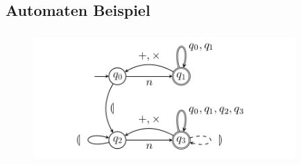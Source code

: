 \documentclass[
10pt,
pantone315, 	%
]{beamer}
\begin{document}
\subsection*{Automaten Beispiel}
\begin{frame}[t]{\secname}
	\begin{figure}
	\includegraphics[width=10cm,height=5cm]{img/opa.png}
	\end{figure}
\end{frame}
\end{document}
